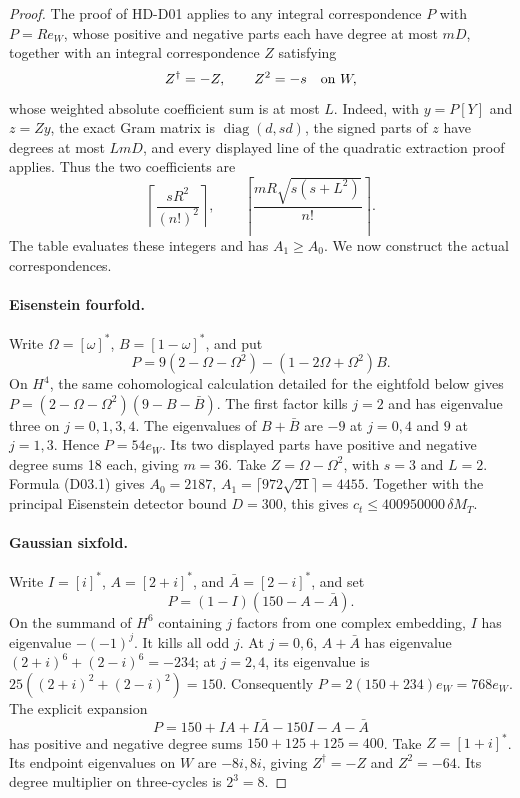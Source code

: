 \begin{proof}
The proof of HD-D01 applies to any integral correspondence \(P\)
with \(P=R e_W\), whose positive and negative parts each have degree
at most \(mD\), together with an integral correspondence \(Z\)
satisfying
\[
 Z^\dagger=-Z,\qquad Z^2=-s\quad\hbox{on }W,
\]
whose weighted absolute coefficient sum is at most \(L\).
Indeed, with \(y=P[Y]\) and \(z=Zy\), the exact Gram matrix is
\(\operatorname{diag}(d,sd)\), the signed parts of \(z\) have
degrees at most \(LmD\), and every displayed line of the quadratic
extraction proof applies. Thus the two coefficients are
\[
 \left\lceil\frac{sR^2}{(n!)^2}\right\rceil,\qquad
 \left\lceil\frac{mR\sqrt{s(s+L^2)}}{n!}\right\rceil.           \tag{D03.1}
\]
The table evaluates these integers and has \(A_1\ge A_0\).
We now construct the actual correspondences.

\paragraph{Eisenstein fourfold.}
Write \(\Omega=[\omega]^*\), \(B=[1-\omega]^*\), and put
\[
 P=9(2-\Omega-\Omega^2)-(1-2\Omega+\Omega^2)B.
\]
On \(H^4\), the same cohomological calculation detailed for the
eightfold below gives
\(P=(2-\Omega-\Omega^2)(9-B-\bar B)\).
The first factor kills \(j=2\) and has eigenvalue three on
\(j=0,1,3,4\). The eigenvalues of \(B+\bar B\) are \(-9\)
at \(j=0,4\) and \(9\) at \(j=1,3\). Hence \(P=54e_W\).
Its two displayed parts have positive and negative degree sums
18 each, giving \(m=36\). Take \(Z=\Omega-\Omega^2\), with
\(s=3\) and \(L=2\). Formula (D03.1) gives
\(A_0=2187\), \(A_1=\lceil972\sqrt{21}\rceil=4455\).
Together with the principal Eisenstein detector bound \(D=300\),
this gives \(c_t\le400950000\,\delta M_T\).

\paragraph{Gaussian sixfold.}
Write \(I=[i]^*\), \(A=[2+i]^*\), and \(\bar A=[2-i]^*\), and set
\[
 P=(1-I)(150-A-\bar A).
\]
On the summand of \(H^6\) containing \(j\) factors from one complex
embedding, \(I\) has eigenvalue \(-(-1)^j\). It kills all odd \(j\).
At \(j=0,6\), \(A+\bar A\) has eigenvalue
\((2+i)^6+(2-i)^6=-234\); at \(j=2,4\), its eigenvalue is
\(25((2+i)^2+(2-i)^2)=150\). Consequently
\(P=2(150+234)e_W=768e_W\).
The explicit expansion
\[
 P=150+IA+I\bar A-150I-A-\bar A
\]
has positive and negative degree sums
\(150+125+125=400\).
Take \(Z=[1+i]^*\). Its endpoint eigenvalues on \(W\) are
\(-8i,8i\), giving \(Z^\dagger=-Z\) and \(Z^2=-64\).
Its degree multiplier on three-cycles is \(2^3=8\).


\end{proof}
